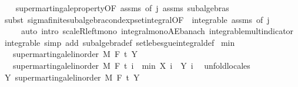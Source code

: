 \begin{isabellebody}
%
\isadelimproof
\ \ %
\endisadelimproof
%
\isatagproof
{}\isamarkupfalse%
\ supermartingale{\isacharunderscore}{\kern0pt}property{\isacharbrackleft}{\kern0pt}OF\ assms{\isacharparenleft}{\kern0pt}{}{\isacharparenright}{\kern0pt}{\isacharcomma}{\kern0pt}\ of\ j{\isacharbrackright}{\kern0pt}\ assms\ subalgebras\isanewline
\ \ \isamarkupfalse%
\ {\isacharparenleft}{\kern0pt}subst\ sigma{\isacharunderscore}{\kern0pt}finite{\isacharunderscore}{\kern0pt}subalgebra{\isachardot}{\kern0pt}cond{\isacharunderscore}{\kern0pt}exp{\isacharunderscore}{\kern0pt}set{\isacharunderscore}{\kern0pt}integral{\isacharbrackleft}{\kern0pt}OF\ {\isacharunderscore}{\kern0pt}\ integrable\ assms{\isacharparenleft}{\kern0pt}{}{\isacharparenright}{\kern0pt}{\isacharcomma}{\kern0pt}\ of\ j{\isacharbrackright}{\kern0pt}{\isacharparenright}{\kern0pt}\isanewline
\ \ \ \ \ {\isacharparenleft}{\kern0pt}auto\ intro{\isacharbang}{\kern0pt}{\isacharcolon}{\kern0pt}\ scaleR{\isacharunderscore}{\kern0pt}left{\isacharunderscore}{\kern0pt}mono\ integral{\isacharunderscore}{\kern0pt}mono{\isacharunderscore}{\kern0pt}AE{\isacharunderscore}{\kern0pt}banach\ integrable{\isacharunderscore}{\kern0pt}mult{\isacharunderscore}{\kern0pt}indicator\ integrable\ simp\ add{\isacharcolon}{\kern0pt}\ subalgebra{\isacharunderscore}{\kern0pt}def\ set{\isacharunderscore}{\kern0pt}lebesgue{\isacharunderscore}{\kern0pt}integral{\isacharunderscore}{\kern0pt}def{\isacharparenright}{\kern0pt}%
\endisatagproof
{\isafoldproof}%
%
\isadelimproof
\isanewline
%
\endisadelimproof
\isanewline
{}\isamarkupfalse%
\ min{\isacharcolon}{\kern0pt}\isanewline
\ \ \ {\isachardoublequoteopen}supermartingale{\isacharunderscore}{\kern0pt}linorder\ M\ F\ t\ Y{\isachardoublequoteclose}\isanewline
\ \ \ {\isachardoublequoteopen}supermartingale{\isacharunderscore}{\kern0pt}linorder\ M\ F\ t\ {\isacharparenleft}{\kern0pt}{\isasymlambda}i\ {\isasymxi}{\isachardot}{\kern0pt}\ min\ {\isacharparenleft}{\kern0pt}X\ i\ {\isasymxi}{\isacharparenright}{\kern0pt}\ {\isacharparenleft}{\kern0pt}Y\ i\ {\isasymxi}{\isacharparenright}{\kern0pt}{\isacharparenright}{\kern0pt}{\isachardoublequoteclose}\isanewline
%
\isadelimproof
%
\endisadelimproof
%
\isatagproof
{}\isamarkupfalse%
\ {\isacharparenleft}{\kern0pt}unfold{\isacharunderscore}{\kern0pt}locales{\isacharparenright}{\kern0pt}\isanewline
\ \ \isamarkupfalse%
\ Y{\isacharcolon}{\kern0pt}\ supermartingale{\isacharunderscore}{\kern0pt}linorder\ M\ F\ t\ Y\ \isamarkupfalse%

\end{isabellebody}
